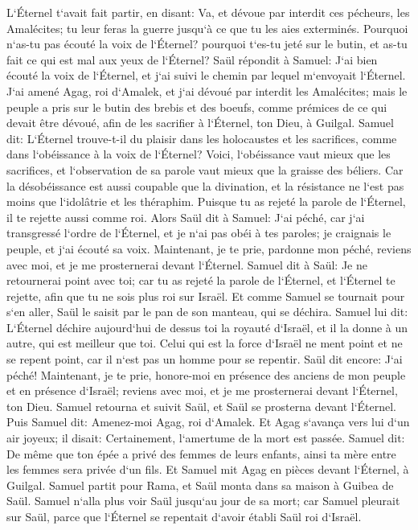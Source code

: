 \verse L`Éternel t`avait fait partir, en disant: Va, et dévoue par interdit ces pécheurs, les Amalécites; tu leur feras la guerre jusqu`à ce que tu les aies exterminés. 
\verse Pourquoi n`as-tu pas écouté la voix de l`Éternel? pourquoi t`es-tu jeté sur le butin, et as-tu fait ce qui est mal aux yeux de l`Éternel? 
\verse Saül répondit à Samuel: J`ai bien écouté la voix de l`Éternel, et j`ai suivi le chemin par lequel m`envoyait l`Éternel. J`ai amené Agag, roi d`Amalek, et j`ai dévoué par interdit les Amalécites; 
\verse mais le peuple a pris sur le butin des brebis et des boeufs, comme prémices de ce qui devait être dévoué, afin de les sacrifier à l`Éternel, ton Dieu, à Guilgal. 
\verse Samuel dit: L`Éternel trouve-t-il du plaisir dans les holocaustes et les sacrifices, comme dans l`obéissance à la voix de l`Éternel? Voici, l`obéissance vaut mieux que les sacrifices, et l`observation de sa parole vaut mieux que la graisse des béliers. 
\verse Car la désobéissance est aussi coupable que la divination, et la résistance ne l`est pas moins que l`idolâtrie et les théraphim. Puisque tu as rejeté la parole de l`Éternel, il te rejette aussi comme roi. 
\verse Alors Saül dit à Samuel: J`ai péché, car j`ai transgressé l`ordre de l`Éternel, et je n`ai pas obéi à tes paroles; je craignais le peuple, et j`ai écouté sa voix. 
\verse Maintenant, je te prie, pardonne mon péché, reviens avec moi, et je me prosternerai devant l`Éternel. 
\verse Samuel dit à Saül: Je ne retournerai point avec toi; car tu as rejeté la parole de l`Éternel, et l`Éternel te rejette, afin que tu ne sois plus roi sur Israël. 
\verse Et comme Samuel se tournait pour s`en aller, Saül le saisit par le pan de son manteau, qui se déchira. 
\verse Samuel lui dit: L`Éternel déchire aujourd`hui de dessus toi la royauté d`Israël, et il la donne à un autre, qui est meilleur que toi. 
\verse Celui qui est la force d`Israël ne ment point et ne se repent point, car il n`est pas un homme pour se repentir. 
\verse Saül dit encore: J`ai péché! Maintenant, je te prie, honore-moi en présence des anciens de mon peuple et en présence d`Israël; reviens avec moi, et je me prosternerai devant l`Éternel, ton Dieu. 
\verse Samuel retourna et suivit Saül, et Saül se prosterna devant l`Éternel. 
\verse Puis Samuel dit: Amenez-moi Agag, roi d`Amalek. Et Agag s`avança vers lui d`un air joyeux; il disait: Certainement, l`amertume de la mort est passée. 
\verse Samuel dit: De même que ton épée a privé des femmes de leurs enfants, ainsi ta mère entre les femmes sera privée d`un fils. Et Samuel mit Agag en pièces devant l`Éternel, à Guilgal. 
\verse Samuel partit pour Rama, et Saül monta dans sa maison à Guibea de Saül. 
\verse Samuel n`alla plus voir Saül jusqu`au jour de sa mort; car Samuel pleurait sur Saül, parce que l`Éternel se repentait d`avoir établi Saül roi d`Israël. 

